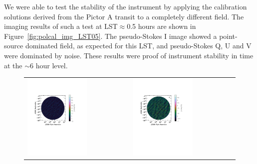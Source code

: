 We were able to test the stability of the instrument by applying the calibration solutions derived from the Pictor A transit to a completely different field. The imaging results of such a test at LST$\approx$0.5 hours are shown in Figure~\ref{fig:polcal_img_LST05}. The pseudo-Stokes I image showed a point-source dominated field, as expected for this LST, and pseudo-Stokes Q, U and V were dominated by noise. These results were proof of instrument stability in time at the $\sim$6 hour level.

\begin{figure}
\hspace{-2cm}\begin{tabular}{ll}
\includegraphics[clip, trim=0.5cm 11cm 3cm 5cm, width=0.6\textwidth]{chapters/polcal/figures/47501-I-better.pdf} &
\includegraphics[clip, trim=0.5cm 11cm 3cm 5cm, width=0.6\textwidth]{chapters/polcal/figures/47501-Q-better.pdf} \\

\end{tabular}
\end{figure}
